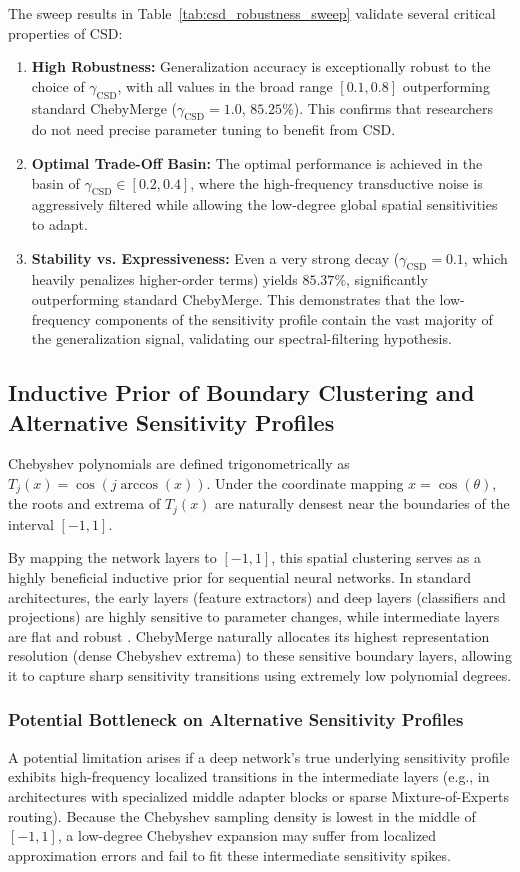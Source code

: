 \documentclass{article}
\theoremstyle{plain}
\theoremstyle{definition}
\theoremstyle{remark}
\begin{document}
The sweep results in Table~\ref{tab:csd_robustness_sweep} validate several critical properties of CSD:
\begin{enumerate}
    \item \textbf{High Robustness:} Generalization accuracy is exceptionally robust to the choice of $\gamma_{\text{CSD}}$, with all values in the broad range $[0.1, 0.8]$ outperforming standard ChebyMerge ($\gamma_{\text{CSD}} = 1.0$, $85.25\%$). This confirms that researchers do not need precise parameter tuning to benefit from CSD.
    \item \textbf{Optimal Trade-Off Basin:} The optimal performance is achieved in the basin of $\gamma_{\text{CSD}} \in [0.2, 0.4]$, where the high-frequency transductive noise is aggressively filtered while allowing the low-degree global spatial sensitivities to adapt.
    \item \textbf{Stability vs. Expressiveness:} Even a very strong decay ($\gamma_{\text{CSD}} = 0.1$, which heavily penalizes higher-order terms) yields $85.37\%$, significantly outperforming standard ChebyMerge. This demonstrates that the low-frequency components of the sensitivity profile contain the vast majority of the generalization signal, validating our spectral-filtering hypothesis.
\end{enumerate}

\subsection{Inductive Prior of Boundary Clustering and Alternative Sensitivity Profiles}
Chebyshev polynomials are defined trigonometrically as $T_j(x) = \cos(j \arccos(x))$. Under the coordinate mapping $x = \cos(\theta)$, the roots and extrema of $T_j(x)$ are naturally densest near the boundaries of the interval $[-1, 1]$. 

By mapping the network layers to $[-1, 1]$, this spatial clustering serves as a highly beneficial inductive prior for sequential neural networks. In standard architectures, the early layers (feature extractors) and deep layers (classifiers and projections) are highly sensitive to parameter changes, while intermediate layers are flat and robust \cite{zhang2019all}. ChebyMerge naturally allocates its highest representation resolution (dense Chebyshev extrema) to these sensitive boundary layers, allowing it to capture sharp sensitivity transitions using extremely low polynomial degrees.

\subsubsection{Potential Bottleneck on Alternative Sensitivity Profiles}
A potential limitation arises if a deep network's true underlying sensitivity profile exhibits high-frequency localized transitions in the intermediate layers (e.g., in architectures with specialized middle adapter blocks or sparse Mixture-of-Experts routing). Because the Chebyshev sampling density is lowest in the middle of $[-1, 1]$, a low-degree Chebyshev expansion may suffer from localized approximation errors and fail to fit these intermediate sensitivity spikes.
\end{document}

